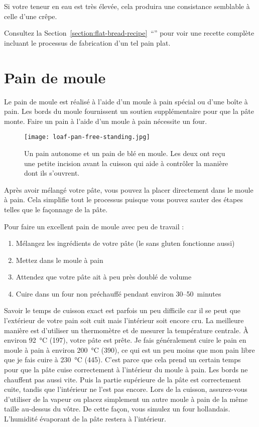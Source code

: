 Si votre teneur en eau est très élevée, cela produira une
consistance semblable à celle d'une crêpe.

Consultez la Section~\ref{section:flat-bread-recipe}~``''
pour voir une recette complète incluant le processus de fabrication d'un tel pain plat.

\section{Pain de moule}

Le pain de moule est réalisé à l'aide d'un moule à pain spécial
ou d'une boîte à pain. Les bords du moule fournissent un soutien supplémentaire
pour que la pâte monte. Faire un pain à l'aide d'un moule à pain nécessite
un four.

\begin{figure}[!htb]
  \texttt{[image: loaf-pan-free-standing.jpg]}
  \caption[Pain autonome et pain en moule]{Un pain autonome et un pain de blé
      en moule. Les deux ont reçu une petite incision avant la cuisson
      qui aide à contrôler la manière dont ils s'ouvrent.}%
  \label{fig:free-standing-loaf-pan}
\end{figure}

Après avoir mélangé votre pâte, vous pouvez la placer directement dans le moule à pain.
Cela simplifie tout le processus puisque vous pouvez sauter des étapes telles que
le façonnage de la pâte.

Pour faire un excellent pain de moule avec peu de travail :

\begin{enumerate}
    \item Mélangez les ingrédients de votre pâte (le sans gluten fonctionne aussi)
    \item Mettez dans le moule à pain
    \item Attendez que votre pâte ait à peu près doublé de volume
    \item Cuire dans un four non préchauffé pendant environ 30--50~minutes
\end{enumerate}
Savoir le temps de cuisson exact est parfois un peu difficile car il se peut que l'extérieur de votre pain soit cuit mais l'intérieur soit encore cru. La meilleure manière est d'utiliser un thermomètre et de mesurer la température centrale. À environ  \qty{92}{\degreeCelsius} (\qty{197}{\degF}), votre pâte est prête. Je fais généralement cuire le pain en moule à pain à environ  \qty{200}{\degreeCelsius} (\qty{390}{\degF}), ce qui est un peu moins que mon pain libre que je fais cuire à  \qty{230}{\degreeCelsius} (\qty{445}{\degF}). C'est parce que cela prend un certain temps pour que la pâte cuise correctement à l'intérieur du moule à pain. Les bords ne chauffent pas aussi vite. Puis la partie supérieure de la pâte est correctement cuite, tandis que l'intérieur ne l'est pas encore. Lors de la cuisson, assurez-vous d'utiliser de la vapeur ou placez simplement un autre moule à pain de la même taille au-dessus du vôtre. De cette façon, vous simulez un four hollandais. L'humidité évaporant de la pâte restera à l'intérieur.

